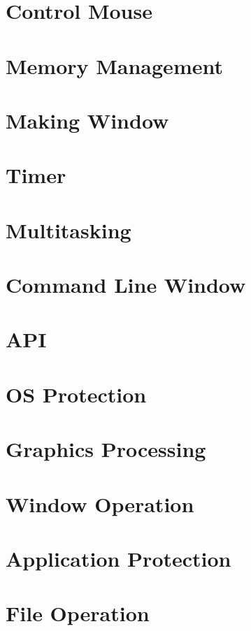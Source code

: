 \documentclass{swfcthesisp}
\begin{document}
\section{Control Mouse}


\section{Memory Management}

\section{Making Window }

\section{Timer}

\section{Multitasking}

\section{Command Line Window}

\section{API}

\section{OS Protection}

\section{Graphics Processing}

\section{Window Operation}

\section{Application Protection}

\section{File Operation}
\end{document}
